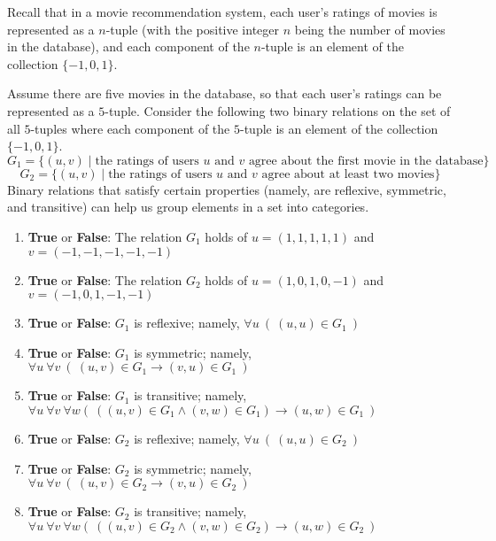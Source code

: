 
Recall that 
in a movie recommendation system, each 
user's ratings of movies is represented as a $n$-tuple (with the positive integer $n$  
being the number of movies in the database), and each  component of 
the $n$-tuple is an element of  the collection $\{-1,0,1\}$.

Assume there are five movies in the database, so that  each user's ratings
can be represented as a $5$-tuple. Consider the following two binary relations on the  
set of all $5$-tuples where each component 
of the $5$-tuple is an element of the collection $\{-1,0,1\}$.
\[
G_1 =  \{  (u,v)  \mid 
\text{the ratings of users $u$  and  $v$  agree about the first 
movie in the database} \}
\]
\[
G_2 =  \{  (u,v)  \mid 
\text{the ratings of users $u$  and  $v$  agree about at least two movies} \}
\]
Binary  relations that satisfy certain 
properties (namely,  are  reflexive, symmetric,
and transitive)  can help us group 
elements in a set into categories. 


\begin{enumerate}
    \item {\bf True} or {\bf False}: 
    The  relation $G_1$ holds of  $u=(1,1,1,1,1)$ and
    $v=(-1,-1,-1,-1,-1)$
    \item {\bf True} or {\bf False}: 
    The  relation $G_2$ holds of  $u=(1,0,1,0,-1)$ and
    $v=(-1,0,1,-1,-1)$
    \item {\bf True} or {\bf False}: $G_1$ is reflexive; namely, 
    $\forall u  ~(~(u,u) \in G_1~)$
    \item {\bf True} or {\bf False}:  $G_1$ is symmetric; namely, 
    $\forall u ~\forall  v ~(~(u,v) \in G_1 \to  (v,u) \in G_1~)$
    \item {\bf True} or {\bf False}:  $G_1$ is transitive; namely, 
    $\forall u ~\forall  v  ~\forall w (~\left( (u,v) \in G_1 \wedge (v,w)\in G_1\right) \to  (u,w) \in G_1~)$
    \item {\bf True} or {\bf False}:  $G_2$ is reflexive; namely, 
    $\forall u   ~(~(u,u) \in G_2~)$
    \item {\bf True} or {\bf False}:  $G_2$ is symmetric; namely, 
    $\forall u ~\forall  v  ~(~(u,v)\in G_2 \to  (v,u) \in G_2~)$
    \item {\bf True} or {\bf False}:  $G_2$ is transitive; namely, 
    $\forall u~\forall  v  ~\forall w (~\left( (u,v) \in G_2 \wedge (v,w)\in G_2\right) \to  (u,w) \in G_2~)$
\end{enumerate}
